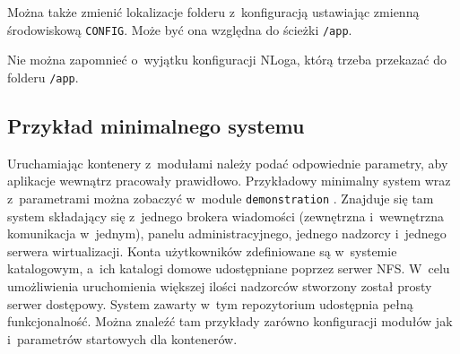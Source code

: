\documentclass[../opis-rozwiazania.tex]{subfiles}
\begin{document}
Można także zmienić lokalizacje folderu z~konfiguracją ustawiając zmienną środowiskową \texttt{CONFIG}.
Może być ona względna do ścieżki \texttt{/app}.

Nie można zapomnieć o~wyjątku konfiguracji NLoga, którą trzeba przekazać do folderu \texttt{/app}.

\subsection{Przykład minimalnego systemu}
Uruchamiając kontenery z~modułami należy podać odpowiednie parametry, aby aplikacje wewnątrz pracowały prawidłowo.
Przykładowy minimalny system wraz z~parametrami można zobaczyć w~module \texttt{demonstration} \parencite{ocd-demo}.
Znajduje się tam system składający się z~jednego brokera wiadomości (zewnętrzna i~wewnętrzna komunikacja w~jednym), panelu administracyjnego, jednego nadzorcy i~jednego serwera wirtualizacji. Konta użytkowników zdefiniowane są w~systemie katalogowym, a~ich katalogi domowe udostępniane poprzez serwer NFS. W~celu umożliwienia uruchomienia większej ilości nadzorców stworzony został prosty serwer dostępowy.
System zawarty w~tym repozytorium udostępnia pełną funkcjonalność.
Można znaleźć tam przykłady zarówno konfiguracji modułów jak i~parametrów startowych dla kontenerów.
\end{document}
